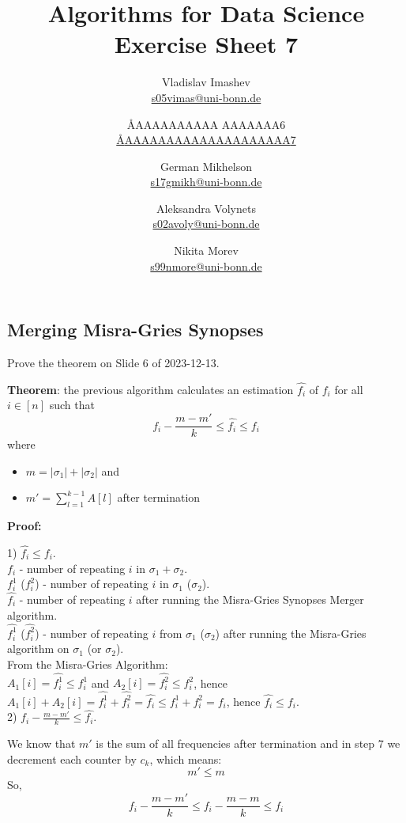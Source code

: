 \documentclass{article}
\title{Algorithms for Data Science \\ Exercise Sheet 7}
\author{
  Vladislav Imashev \\ \href{mailto:s05vimas@uni-bonn.de}{s05vimas@uni-bonn.de} \and
  \AA{AAAAAAAAAA AAAAAAA}{6} \\ \href{mailto:\AA{AAAAAAAAAAAAAAAAAAAA}{7}}{\AA{AAAAAAAAAAAAAAAAAAAA}{7}} \and
  German Mikhelson \\ \href{mailto:s17gmikh@uni-bonn.de}{s17gmikh@uni-bonn.de} \and
  Aleksandra Volynets \\ \href{mailto:s02avoly@uni-bonn.de}{s02avoly@uni-bonn.de} \and
  Nikita Morev \\ \href{mailto:s99nmore@uni-bonn.de}{s99nmore@uni-bonn.de}
}
\begin{document}
  \maketitle

  \setcounter{section}{7}
  \subsection{Merging Misra-Gries Synopses}
  \begin{centerframebox}
    Prove the theorem on Slide 6 of 2023-12-13.

    \textbf{Theorem}: the previous algorithm calculates an estimation $\hat{f_i}$ of $f_i$ for all $i \in [n]$ such that
    \[ f_i - \frac{m-m'}{k} \leq \hat{f_i} \leq f_i \]
    where
    \begin{itemize}
      \item $m = |\sigma_1| + |\sigma_2|$ and
      \item $m' = \sum_{l=1}^{k-1} A[l]$ after termination
    \end{itemize}
  \end{centerframebox}

  \textbf{Proof:}

  1) $\hat{f_i} \leq f_i$. \\
  $f_i$ - number of repeating $i$ in $\sigma_1 + \sigma_2$. \\
  $f^1_i$ ($f^2_i$) - number of repeating $i$ in $\sigma_1$ ($\sigma_2$). \\
  $\hat{f_i}$ - number of repeating $i$ after running the Misra-Gries Synopses Merger algorithm. \\
  $\hat{f^1_i}$ ($\hat{f^2_i}$) - number of repeating $i$ from $\sigma_1$ ($\sigma_2$) after running the Misra-Gries algorithm on $\sigma_1$ (or $\sigma_2$). \\

  From the Misra-Gries Algorithm: \\
  $A_1[i] = \hat{f^1_i} \leq f^1_i$ and $A_2[i] = \hat{f^2_i} \leq f^2_i$, hence $A_1[i] + A_2[i] = \hat{f^1_i} + \hat{f^2_i} = \hat{f_i} \leq f^1_i + f^2_i = f_i$, hence $\hat{f_i} \leq f_i$. \\

  2) $f_i - \frac{m-m'}{k} \leq \hat{f_i}$.

  We know that $m'$ is the sum of all frequencies after termination and in step 7 we decrement each counter by $c_k$, which means:
  \[m' \leq m\]
  So,
  \[f_i - \frac{m-m'}{k} \leq f_i - \frac{m-m}{k} \leq f_i\]
\end{document}
